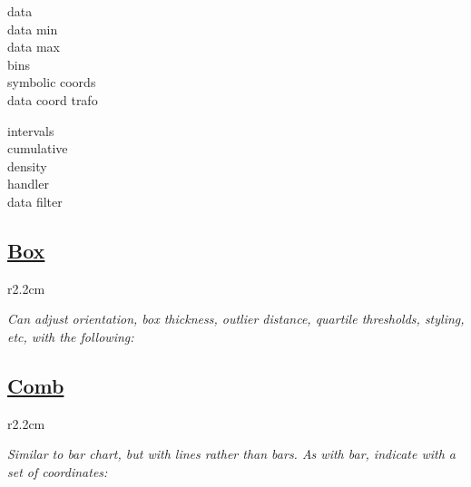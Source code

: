 {\color{blue}
\begin{minipage}[t]{3.0cm}
data\\
data min\\
data max\\
bins\\
symbolic coords\\
data coord trafo
\end{minipage}
\begin{minipage}[t]{3.0cm}
intervals\\
cumulative\\
density\\
handler\\
data filter\\
\end{minipage}}



\subsection*{\href{\docurl\#pgfp./pgfplots/box}{Box}}

\begin{wrapfigure}[5]{r}{2.2cm}
\vspace{-8mm}
\resizebox{2cm}{!}{}
\end{wrapfigure}

\textit{Can adjust orientation, box thickness, outlier distance, quartile thresholds,  styling, etc, with the following:}

{\color{blue}
\begin{minipage}[t]{3.0cm}
\end{minipage}
\begin{minipage}[t]{3.0cm}
\end{minipage}}



\subsection*{\href{\docurl\#pgfp./tikz/xcomb}{Comb}}


\begin{wrapfigure}[5]{r}{2.2cm}
\vspace{-8mm}
\resizebox{2cm}{!}{}
\end{wrapfigure}

\textit{Similar to bar chart, but with lines rather than bars. As with bar, indicate with a set of coordinates:}\\
\\


